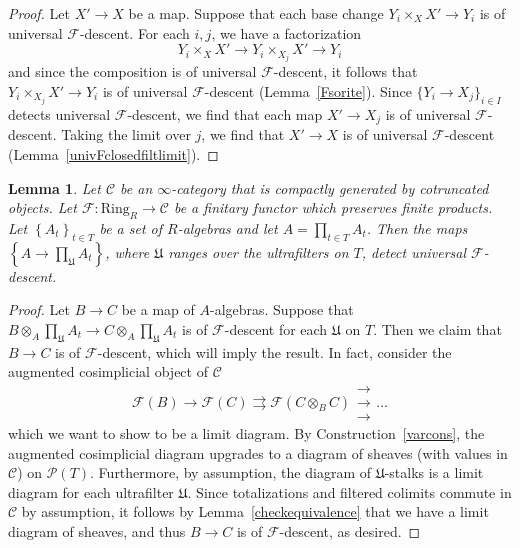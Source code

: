 \documentclass[reqno]{amsart}
\newcommand{\triplearrows}{\begin{smallmatrix} \to \\ \to \\ 
\to \end{smallmatrix} }
\newtheorem{lemma}[theorem]{Lemma}
\theoremstyle{definition}
\begin{document}
\begin{proof} 
Let $X' \to X $ be a map. Suppose that each base change $Y_i \times_X X' \to Y_i$ is  of universal $\mathcal{F}$-descent. 
For each $i, j$, we have a factorization
\[  Y_i \times_X X' \to  
Y_i \times_{X_j} X' \to Y_i
\]
and since the composition is of universal $\mathcal{F}$-descent, it follows that 
$Y_i \times_{X_j} X' \to Y_i$ is of universal $\mathcal{F}$-descent (Lemma~\ref{Fsorite}). 
Since $\{Y_i \to X_j\}_{i \in I}$ detects universal $\mathcal{F}$-descent, we find that
each map 
$X' \to X_j$ is of universal $\mathcal{F}$-descent. Taking the limit over $j$,
we find that $X' \to X$ is of universal $\mathcal{F}$-descent
(Lemma~\ref{univFclosedfiltlimit}). 
\end{proof} 


\begin{lemma} 
\label{ultraproductdetects}
Let $\mathcal{C}$ be 
an $\infty$-category that is compactly generated by cotruncated objects. 
Let $\mathcal{F}\colon  \mathrm{Ring}_R \to \mathcal{C}$ be a finitary functor which
preserves finite products. Let $\left\{A_t\right\}_{t \in T}$ be a set of $R$-algebras and let $A =
\prod_{t \in T} A_t$. 
Then the maps $\left\{A \to \prod_{\mathfrak{U}} A_t\right\}$,
where $\mathfrak{U}$
ranges over the ultrafilters on $T$, detect universal $\mathcal{F}$-descent. 
\end{lemma} 

\begin{proof} 

Let $B \to C$ be a map of $A$-algebras. 
Suppose that $B \otimes_A \prod_{\mathfrak{U}} A_t \to C \otimes_A
\prod_{\mathfrak{U}} A_t$ is of $\mathcal{F}$-descent for each $\mathfrak{U}$ on $T$. Then we claim that 
$B \to C$ is of $\mathcal{F}$-descent, which will imply the result. 
In fact, 
consider the augmented cosimplicial object of $\mathcal{C}$
\begin{equation}  \mathcal{F}(B) \to  \mathcal{F}(C) \rightrightarrows \mathcal{F}( C \otimes_B C)
\triplearrows \dots   \end{equation}
which we want to show to be a limit diagram. 
By Construction~\ref{varcons}, 
the augmented cosimplicial diagram upgrades to a diagram of sheaves (with values
in $\mathcal{C}$) on
$\mathcal{P}(T)$. Furthermore, by assumption, the diagram of
$\mathfrak{U}$-stalks is a limit diagram for each ultrafilter $\mathfrak{U}$. 
Since totalizations and filtered colimits commute in $\mathcal{C}$ by
assumption, it follows by Lemma~\ref{checkequivalence} that 
we have a limit diagram of sheaves, and thus $B \to C$ is of
$\mathcal{F}$-descent, as
desired. 
\end{proof} 
\end{document}

